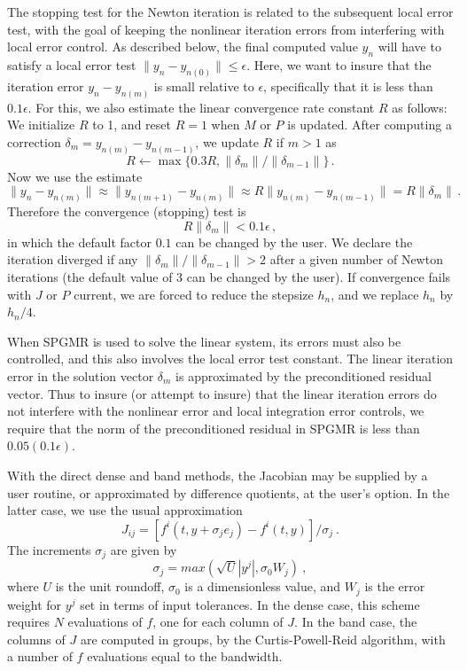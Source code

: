 The stopping test for the Newton iteration is related to the
subsequent local error test, with the goal of keeping the nonlinear
iteration errors from interfering with local error control.  As
described below, the final computed value $y_n$ will have to satisfy a
local error test $\| y_n - y_{n(0)} \| \leq \epsilon$.  Here, we want
to insure that the iteration error $y_n - y_{n(m)}$ is small relative
to $\epsilon$, specifically that it is less than $0.1 \epsilon$.
For this, we also estimate the linear convergence rate constant $R$ as
follows: We initialize $R$ to 1, and reset $R = 1$ when $M$ or $P$ is
updated.  After computing a correction $\delta_m = y_{n(m)}-y_{n(m-1)}$,
we update $R$ if $m > 1$ as
\begin{equation*}
  R \leftarrow \max\{0.3R , \|\delta_m\| / \|\delta_{m-1}\| \} \, . 
\end{equation*}
Now we use the estimate
\begin{equation*}
  \| y_n - y_{n(m)} \| \approx \| y_{n(m+1)} - y_{n(m)} \| 
  \approx R \| y_{n(m)} - y_{n(m-1)} \|  =  R \|\delta_m \| \, . 
\end{equation*}
Therefore the convergence (stopping) test is 
\begin{equation*}
  R \|\delta_m \| < 0.1 \epsilon \, , 
\end{equation*}
in which the default factor $0.1$ can be changed by the user. We declare the 
iteration diverged if any $\|\delta_m\| / \|\delta_{m-1}\| > 2$ after a given 
number of Newton iterations (the default value of 3 can be changed by the user).  
If convergence fails with $J$ or $P$ current, we are forced to reduce the stepsize
$h_n$, and we replace $h_n$ by $h_n/4$.

When SPGMR is used to solve the linear system, its errors must also be
controlled, and this also involves the local error test constant.  The
linear iteration error in the solution vector $\delta_m$ is
approximated by the preconditioned residual vector.  Thus to insure
(or attempt to insure) that the linear iteration errors do not
interfere with the nonlinear error and local integration error
controls, we require that the norm of the preconditioned residual
in SPGMR is less than $0.05(0.1 \epsilon)$.

With the direct dense and band methods, the Jacobian may be supplied
by a user routine, or approximated by difference quotients,
at the user's option.  In the latter case, we use the usual
approximation
\[ J_{ij} = [f^i(t,y+\sigma_j e_j) - f^i(t,y)]/\sigma_j ~. \]
The increments $\sigma_j$ are given by
\[ \sigma_j = max(\sqrt{U} |y^j| , \sigma_0 W_j) ~, \]
where $U$ is the unit roundoff, $\sigma_0$ is a dimensionless value,
and $W_j$ is the error weight for $y^j$ set in terms of input
tolerances.  In the dense case, this scheme requires $N$ evaluations
of $f$, one for each column of $J$.  In the band case, the columns
of $J$ are computed in groups, by the Curtis-Powell-Reid algorithm,
with a number of $f$ evaluations equal to the bandwidth.

